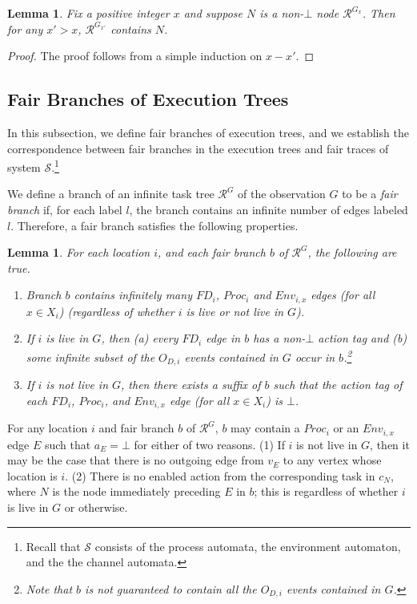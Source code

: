 \documentclass[11pt]{article}
\numberwithin{theorem}{section}
\newtheorem{lemma}[theorem]{Lemma}
\begin{document}
\begin{lemma}\label{lem:nodePersistsForEver}
Fix a positive integer $x$ and suppose $N$ is a non-$\bot$ node  $\mathcal{R}^{G_x}$. Then for any $x' > x$, $\mathcal{R}^{G_{x'}}$ contains $N$.
\end{lemma}
\begin{proof}
The proof follows from a simple induction on $x-x'$.
\end{proof}
 
\subsection{Fair Branches of Execution Trees}\label{subset:FairBranchesOfExecutionTrees}




In this subsection, we define fair branches of execution trees, and we establish the correspondence between fair branches
in the execution trees and fair traces of system $\mathcal{S}$.\footnote{Recall that $\mathcal{S}$ consists of the process automata, the environment automaton, and the the channel automata.} 

We define a branch of an infinite task tree $\mathcal{R}^G$ of the observation $G$ to be a \emph{fair branch} if, for each label $l$, the branch contains an infinite number of edges labeled $l$. Therefore, a fair branch satisfies the following properties. 
\begin{lemma}\label{lem:fairTreeBranchProperties}
For each location $i$, and each fair branch $b$ of $\mathcal{R}^G$, the following are true.
\begin{enumerate}
\item Branch $b$ contains infinitely many $FD_i$, $Proc_i$ and $Env_{i,x}$ edges (for all $x \in X_i$) (regardless of whether $i$ is live or not live in $G$).
\item If $i$ is live in $G$, then (a) every $FD_i$ edge in $b$ has a non-$\bot$ action tag and (b) some infinite subset of the $O_{D,i}$ events contained in $G$ occur in $b$.\footnote{Note that $b$ is not guaranteed to contain all the $O_{D,i}$ events contained in $G$.}
\item If $i$ is not live in $G$, then there exists a suffix of $b$ such that the action tag of each $FD_i$, $Proc_i$, and $Env_{i,x}$ edge (for all $x \in X_i$) is $\bot$.
\end{enumerate}
\end{lemma}
For any location $i$ and fair branch $b$ of $\mathcal{R}^G$, $b$ may contain a $Proc_i$ or an $Env_{i,x}$ edge $E$ such that $a_E = \bot$ for either of two reasons. (1) If $i$ is not live in $G$, then it may be the case that there is no outgoing edge from $v_E$ to any vertex whose location is $i$. (2) There is no enabled action from the corresponding task in $c_N$, where $N$ is the node immediately preceding $E$ in $b$; this is regardless of whether $i$ is live in $G$ or otherwise.
\end{document}
